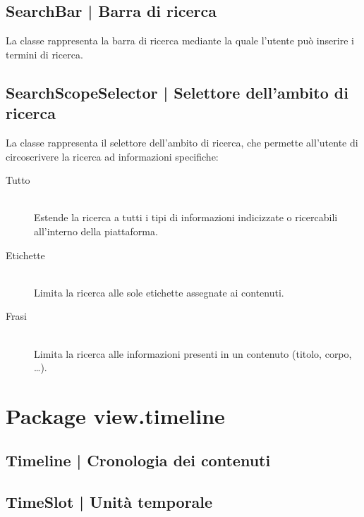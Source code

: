 \documentclass[10pt,a4paper,headinclude,footinclude,hidelinks]{scrreprt} %
\begin{document}
	\subsection[SearchBar]{SearchBar | Barra di ricerca}
	\label{sec:stage:design:sistema:view.search:search-bar}
	La classe \textit{} rappresenta la barra di ricerca mediante la quale l'utente può inserire i termini di ricerca.

	\subsection[SearchScopeSelector]{SearchScopeSelector | Selettore dell'ambito di ricerca}
	\label{sec:stage:design:sistema:view.search:search-scope-selector}
	La classe \textit{} rappresenta il selettore dell'ambito di ricerca, che permette all'utente di circoscrivere la ricerca ad informazioni specifiche:
	\begin{description}
	\item[Tutto] \hfill \\
	Estende la ricerca a tutti i tipi di informazioni indicizzate o ricercabili all'interno della piattaforma.
 	\item[Etichette] \hfill \\
	Limita la ricerca alle sole etichette assegnate ai contenuti.
	\item[Frasi] \hfill \\
	Limita la ricerca alle informazioni presenti in un contenuto (titolo, corpo, \ldots).
	\end{description}

	\section{Package view.timeline}
	\label{sec:stage:design:sistema:view.timeline}

	\subsection[Timeline]{Timeline | Cronologia dei contenuti}
	\label{sec:stage:design:sistema:view.timeline:timeline-view}

	\subsection[TimeSlot]{TimeSlot | Unità temporale}
	\label{sec:stage:design:sistema:view.timeline:time-slot}
\end{document}
